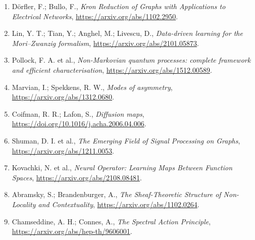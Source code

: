 \documentclass[11pt,a4paper,openany]{report}
\begin{document}
\begin{enumerate}
\item 
Dörfler, F.; Bullo, F., \emph{Kron Reduction of Graphs with Applications to Electrical Networks}, \href{https://arxiv.org/abs/1102.2950}{https:/\allowbreak{}/\allowbreak{}arxiv.org/\allowbreak{}abs/\allowbreak{}1102.2950}.

\item 
Lin, Y. T.; Tian, Y.; Anghel, M.; Livescu, D., \emph{Data-driven learning for the Mori--Zwanzig formalism}, \href{https://arxiv.org/abs/2101.05873}{https:/\allowbreak{}/\allowbreak{}arxiv.org/\allowbreak{}abs/\allowbreak{}2101.05873}.

\item 
Pollock, F. A. et al., \emph{Non-Markovian quantum processes: complete framework and efficient characterisation}, \href{https://arxiv.org/abs/1512.00589}{https:/\allowbreak{}/\allowbreak{}arxiv.org/\allowbreak{}abs/\allowbreak{}1512.00589}.

\item 
Marvian, I.; Spekkens, R. W., \emph{Modes of asymmetry}, \href{https://arxiv.org/abs/1312.0680}{https:/\allowbreak{}/\allowbreak{}arxiv.org/\allowbreak{}abs/\allowbreak{}1312.0680}.

\item 
Coifman, R. R.; Lafon, S., \emph{Diffusion maps}, \href{https://doi.org/10.1016/j.acha.2006.04.006}{https:/\allowbreak{}/\allowbreak{}doi.org/\allowbreak{}10.1016/\allowbreak{}j.acha.2006.04.006}.

\item 
Shuman, D. I. et al., \emph{The Emerging Field of Signal Processing on Graphs}, \href{https://arxiv.org/abs/1211.0053}{https:/\allowbreak{}/\allowbreak{}arxiv.org/\allowbreak{}abs/\allowbreak{}1211.0053}.

\item 
Kovachki, N. et al., \emph{Neural Operator: Learning Maps Between Function Spaces}, \href{https://arxiv.org/abs/2108.08481}{https:/\allowbreak{}/\allowbreak{}arxiv.org/\allowbreak{}abs/\allowbreak{}2108.08481}.

\item 
Abramsky, S.; Brandenburger, A., \emph{The Sheaf-Theoretic Structure of Non-Locality and Contextuality}, \href{https://arxiv.org/abs/1102.0264}{https:/\allowbreak{}/\allowbreak{}arxiv.org/\allowbreak{}abs/\allowbreak{}1102.0264}.

\item 
Chamseddine, A. H.; Connes, A., \emph{The Spectral Action Principle}, \href{https://arxiv.org/abs/hep-th/9606001}{https:/\allowbreak{}/\allowbreak{}arxiv.org/\allowbreak{}abs/\allowbreak{}hep-th/\allowbreak{}9606001}.

\end{enumerate}
\end{document}
